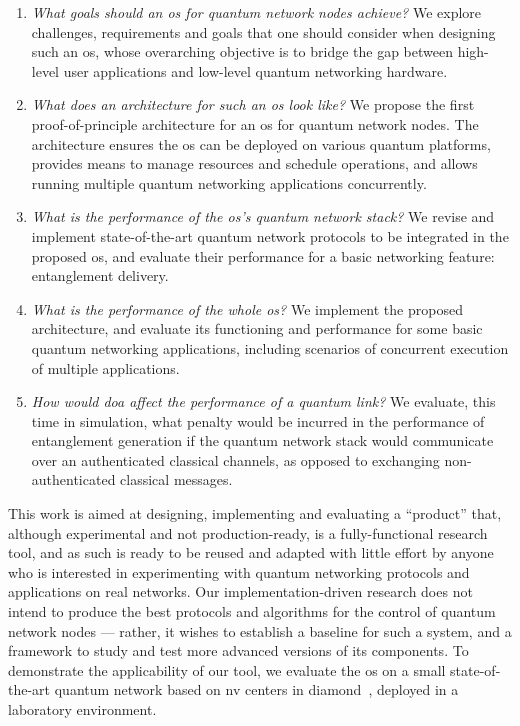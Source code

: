 \begin{enumerate}[label={Q\arabic*.}]
    \item \emph{What goals should an \acrshort{os} for quantum network nodes achieve?} We explore
          challenges, requirements and goals that one should consider when designing such an
          \acrshort{os}, whose overarching objective is to bridge the gap between high-level user
          applications and low-level quantum networking hardware.
    \item \emph{What does an architecture for such an \acrshort{os} look like?} We propose the first
          proof-of-principle architecture for an \acrshort{os} for quantum network nodes. The
          architecture ensures the \acrshort{os} can be deployed on various quantum platforms,
          provides means to manage resources and schedule operations, and allows running multiple
          quantum networking applications concurrently.
    \item \emph{What is the performance of the \acrshort{os}'s quantum network stack?} We revise and
          implement state-of-the-art quantum network protocols to be integrated in the proposed
          \acrshort{os}, and evaluate their performance for a basic networking feature: entanglement
          delivery.
    \item \emph{What is the performance of the whole \acrshort{os}?} We implement the proposed
          architecture, and evaluate its functioning and performance for some basic quantum
          networking applications, including scenarios of concurrent execution of multiple
          applications.
    \item \emph{How would \acrlong{doa} affect the performance of a quantum link?} We evaluate, this
          time in simulation, what penalty would be incurred in the performance of entanglement
          generation if the quantum network stack would communicate over an authenticated classical
          channels, as opposed to exchanging non-authenticated classical messages.
\end{enumerate}

This work is aimed at designing, implementing and evaluating a ``product'' that, although
experimental and not production-ready, is a fully-functional research tool, and as such is ready to
be reused and adapted with little effort by anyone who is interested in experimenting with quantum
networking protocols and applications on real networks. Our implementation-driven research does not
intend to produce the best protocols and algorithms for the control of quantum network nodes ---
rather, it wishes to establish a baseline for such a system, and a framework to study and test more
advanced versions of its components. To demonstrate the applicability of our tool, we evaluate the
\acrshort{os} on a small state-of-the-art quantum network based on \acrlong{nv} centers in
diamond~\cite{pompili_2021_multinode}, deployed in a laboratory environment.


